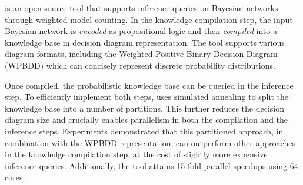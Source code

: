 
\toolname is an open-source tool that supports inference queries on Bayesian networks through weighted model counting.
In the knowledge compilation step, the input Bayesian network is \emph{encoded} as propositional logic and then \emph{compiled} into a knowledge base in decision diagram representation. The tool supports various diagram formats, including the Weighted-Positive Binary Decision Diagram (WPBDD) which can concisely represent discrete probability distributions.

Once compiled, the probabilistic knowledge base can be queried in the inference step.
To efficiently implement both steps, \toolname uses simulated annealing to split the knowledge base into a number of partitions. This further reduces the decision diagram size and crucially enables parallelism in both the compilation and the inference steps.
Experiments demonstrated that this partitioned approach, in combination with the WPBDD representation, can outperform other approaches in the knowledge compilation step, at the cost of slightly more expensive inference queries.
Additionally, the tool attains 15-fold parallel speedups using 64 cores.

